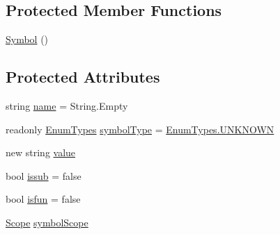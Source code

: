 \subsection*{Protected Member Functions}
\begin{DoxyCompactItemize}
\item 
\hyperlink{class_c_p_u___o_s___simulator_1_1_compiler_1_1_frontend_1_1_symbols_1_1_symbol_ab2d0f42e478b6f15bd25669fc9a0d12f}{Symbol} ()
\end{DoxyCompactItemize}
\subsection*{Protected Attributes}
\begin{DoxyCompactItemize}
\item 
string \hyperlink{class_c_p_u___o_s___simulator_1_1_compiler_1_1_frontend_1_1_symbols_1_1_symbol_a04abf6b34d531519f4f515f3a51e2089}{name} = String.\+Empty
\item 
readonly \hyperlink{namespace_c_p_u___o_s___simulator_1_1_compiler_1_1_frontend_1_1_tokens_a7c0cc43763cc9d01c7d5af34d70b96ea}{Enum\+Types} \hyperlink{class_c_p_u___o_s___simulator_1_1_compiler_1_1_frontend_1_1_symbols_1_1_symbol_acc203e014b77911748322530d94e15e6}{symbol\+Type} = \hyperlink{namespace_c_p_u___o_s___simulator_1_1_compiler_1_1_frontend_a268b68f35fd94ce3549dd33a7e77d7e8a696b031073e74bf2cb98e5ef201d4aa3}{Enum\+Types.\+U\+N\+K\+N\+O\+W\+N}
\item 
new string \hyperlink{class_c_p_u___o_s___simulator_1_1_compiler_1_1_frontend_1_1_symbols_1_1_symbol_a8c243f84c23afefc2b1c26180e187013}{value}
\item 
bool \hyperlink{class_c_p_u___o_s___simulator_1_1_compiler_1_1_frontend_1_1_symbols_1_1_symbol_aab1b4c85076aaa90f5f7c805315db9a3}{issub} = false
\item 
bool \hyperlink{class_c_p_u___o_s___simulator_1_1_compiler_1_1_frontend_1_1_symbols_1_1_symbol_af134735e9120e587a167e421c7395d17}{isfun} = false
\item 
\hyperlink{class_c_p_u___o_s___simulator_1_1_compiler_1_1_frontend_1_1_symbols_1_1_scope}{Scope} \hyperlink{class_c_p_u___o_s___simulator_1_1_compiler_1_1_frontend_1_1_symbols_1_1_symbol_a419df98411144a57ed69fc67b3998294}{symbol\+Scope}
\end{DoxyCompactItemize}
